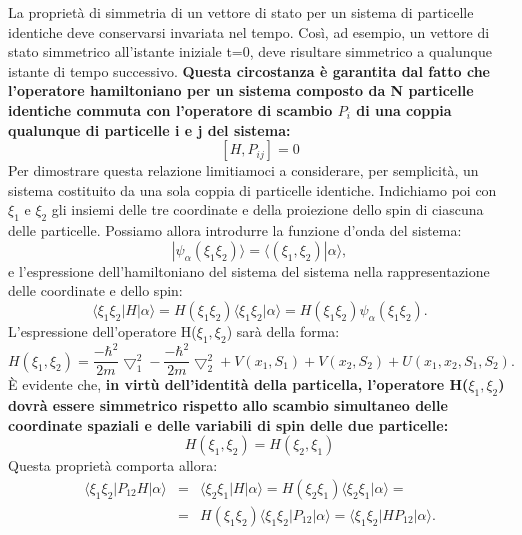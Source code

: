 La proprietà di simmetria di un vettore di stato per un sistema di particelle identiche deve conservarsi invariata nel tempo. Così, ad esempio, un vettore di stato simmetrico all'istante iniziale t=0, deve risultare simmetrico a qualunque istante di tempo successivo. \textbf{Questa circostanza è garantita dal fatto che l'operatore hamiltoniano per un sistema composto da N particelle identiche commuta con l'operatore di scambio $P_{i}$ di una coppia qualunque di particelle i e j del sistema:}\\
\begin{equation}
\left [ H, P_{ij}\right ]=0
\end{equation}
Per dimostrare questa relazione limitiamoci a considerare, per semplicit\`a, un sistema costituito da una sola coppia di particelle identiche. Indichiamo poi con $\xi_{1}$ e $\xi_{2}$ gli insiemi delle tre coordinate e della proiezione dello spin di ciascuna delle particelle. Possiamo allora introdurre la funzione d'onda del sistema:\\
\begin{equation}
|\psi_{\alpha}(\xi_1 \xi_2)\rangle =\langle(\xi_1, \xi_2)|\alpha\rangle ,
\end{equation}
e l'espressione dell'hamiltoniano del sistema del sistema nella rappresentazione delle coordinate e dello spin:
\begin{equation}
\langle \xi_1 \xi_2 |H|\alpha \rangle = H(\xi_1 \xi_2)\langle \xi_1 \xi_2 |\alpha \rangle =  H(\xi_1 \xi_2)\psi_{\alpha}(\xi_1 \xi_2) .
\end{equation}
L'espressione dell'operatore H($\xi_1, \xi_2$) sarà della forma:
\begin{equation}
H(\xi_1, \xi_2) = \frac{-\hbar^2}{2m}\bigtriangledown_1^2-\frac{-\hbar^2}{2m}\bigtriangledown_2^2+V(x_1, S_1)+V(x_2,S_2)+U(x_1,x_2,S_1,S_2) .
\end{equation}
È evidente che, \textbf{in virtù dell'identità della particella, l'operatore H($\xi_1, \xi_2$) dovrà essere simmetrico rispetto allo scambio simultaneo delle coordinate spaziali e delle variabili di spin delle due particelle:}
\begin{equation}
H(\xi_1, \xi_2)=H(\xi_2, \xi_1)
\end{equation}
Questa proprietà comporta allora:
\begin{eqnarray}
\langle \xi_1 \xi_2|P_{12}H|\alpha\rangle &=& \langle \xi_2 \xi_1|H|\alpha\rangle=H(\xi_2 \xi_1)\langle \xi_2 \xi_1|\alpha\rangle= \nonumber \\
&=& H(\xi_1 \xi_2)\langle \xi_1 \xi_2|P_{12}|\alpha\rangle=\langle \xi_1 \xi_2|HP_{12}|\alpha\rangle .
\end{eqnarray}

